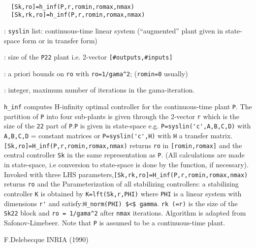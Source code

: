 \begin{mandesc}
   \\ %
\end{mandesc}
\begin{calling_sequence}
\begin{verbatim}
  [Sk,ro]=h_inf(P,r,romin,romax,nmax)  
  [Sk,rk,ro]=h_inf(P,r,romin,romax,nmax)  
\end{verbatim}
\end{calling_sequence}
\begin{parameters}
  \begin{varlist}

    : \verb!syslin! list: continuous-time linear system (``augmented''
    plant given in state-space form or in transfer form)

    : size of the \verb!P22! plant i.e. 2-vector
    \verb![#outputs,#inputs]!
    
    : a priori bounds on \verb!ro! with \verb!ro=1/gama^2!;
    (\verb!romin=0!  usually)

    : integer, maximum number of iterations in the gama-iteration.
  \end{varlist}
\end{parameters}
\begin{mandescription}
  \verb!h_inf! computes H-infinity optimal controller for the continuous-time
  plant \verb!P!.  The partition of \verb!P! into four sub-plants is given
  through the 2-vector \verb!r! which is the size of the \verb!22! part of
  \verb!P!.\verb!P! is given in state-space e.g. \verb!P=syslin('c',A,B,C,D)!
  with \verb!A,B,C,D! = constant matrices or \verb!P=syslin('c',H)! with
  \verb!H! a transfer matrix.\verb![Sk,ro]=H_inf(P,r,romin,romax,nmax)! returns
  \verb!ro! in \verb![romin,romax]! and the central controller \verb!Sk! in the
  same representation as \verb!P!.  (All calculations are made in state-space,
  i.e conversion to state-space is done by the function, if necessary).  Invoked
  with three LHS parameters,\verb![Sk,rk,ro]=H_inf(P,r,romin,romax,nmax)!
  returns \verb!ro! and the Parameterization of all stabilizing controllers: a
  stabilizing controller \verb!K! is obtained by \verb!K=lft(Sk,r,PHI)! where
  \verb!PHI! is a linear system with dimensions \verb!r'! and
  satisfy:\verb!H_norm(PHI) $<$ gamma!.  \verb!rk (=r)! is the size of the
  \verb!Sk22! block and \verb!ro = 1/gama^2!  after \verb!nmax! iterations.
  Algorithm is adapted from Safonov-Limebeer. Note that \verb!P! is assumed to
  be a continuous-time plant.
\end{mandescription}
\begin{manseealso}
      
\end{manseealso}
\begin{authors}
  F.Delebecque INRIA (1990)  
\end{authors}
